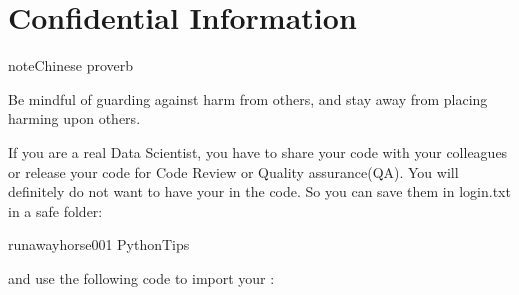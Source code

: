 \documentclass[letterpaper,12pt,english]{sphinxmanual}
\begin{document}
\begin{figure}[htbp]
\centering

\noindent{}
\end{figure}


\chapter{Confidential Information}
\label{\detokenize{confi:confidential-information}}\label{\detokenize{confi:confi}}\label{\detokenize{confi::doc}}
\begin{sphinxadmonition}{note}{Chinese proverb}

Be mindful of guarding against harm from others, and stay away from placing harming upon others.
\end{sphinxadmonition}

If you are a real Data Scientist, you have to share your code with your colleagues or release your code for Code Review or Quality assurance(QA). You will definitely do not want to have your  in the code. So you can save them in login.txt in a safe folder:

%
\begin{sphinxVerbatim}[commandchars=\\\{\}]
runawayhorse001
PythonTips
\end{sphinxVerbatim}

and use the following code to import your :

%
\begin{sphinxVerbatim}[commandchars=\\\{\}]
       
      \PYG{p}{[}\PYG{p}{]}\PYG{p}{[}\PYG{p}{]}
      \PYG{p}{[}\PYG{p}{]}\PYG{p}{[}\PYG{p}{]}
\end{sphinxVerbatim}
\end{document}
